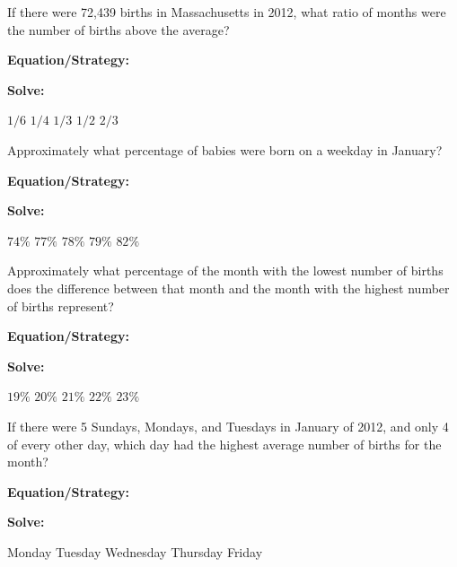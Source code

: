 \begin{multicols*}{2}
\begin{outline}[enumerate]
\medium

\1 If there were 72,439 births in Massachusetts in 2012, what ratio of months were the number of births above the average?

\bigskip
\textbf{Equation/Strategy:} \hrulefill

\bigskip
\textbf{Solve:}

\vfill
\2 $1/6$
\2 $1/4$
\2 $1/3$
\2 $1/2$
\2 $2/3$
\vfill\phantom{}

\columnbreak
\1 Approximately what percentage of babies were born on a weekday in January?

\bigskip
\textbf{Equation/Strategy:} \hrulefill

\bigskip
\textbf{Solve:}

\vfill
\2 $74\%$
\2 $77\%$
\2 $78\%$
\2 $79\%$
\2 $82\%$
\vfill\phantom{}

\pagebreak
\advanced

\1 Approximately what percentage of the month with the lowest number of births does the difference between that month and the month with the highest number of births represent?

\bigskip
\textbf{Equation/Strategy:} \hrulefill

\bigskip
\textbf{Solve:} 

\vfill
\2 $19\%$
\2 $20\%$
\2 $21\%$
\2 $22\%$
\2 $23\%$

\midline

\1 If there were 5 Sundays, Mondays, and Tuesdays in January of 2012, and only 4 of every other day, which day had the highest average number of births for the month?

\bigskip
\textbf{Equation/Strategy:}

\bigskip
\textbf{Solve:}

\vfill
\2 Monday
\2 Tuesday
\2 Wednesday
\2 Thursday
\2 Friday
\end{outline}
\end{multicols*}